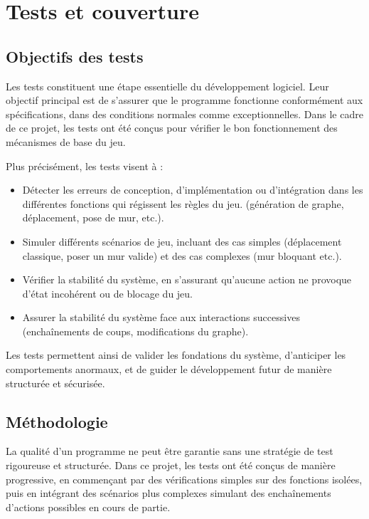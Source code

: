 \section{Tests et couverture} 
\label{sec:part-chle7}

\subsection{Objectifs des tests}

Les tests constituent une étape essentielle du développement logiciel. Leur objectif principal est de s'assurer que le programme fonctionne conformément aux spécifications, dans des conditions normales comme exceptionnelles. Dans le cadre de ce projet, les tests ont été conçus pour vérifier le bon fonctionnement des mécanismes de base du jeu.

Plus précisément, les tests visent à :
\begin{itemize}
    \item Détecter les erreurs de conception, d’implémentation ou d'intégration dans les différentes fonctions qui régissent les règles du jeu. (génération de graphe, déplacement, pose de mur, etc.).
    \item Simuler différents scénarios de jeu, incluant des cas simples (déplacement classique, poser un mur valide) et des cas complexes (mur bloquant etc.).
    \item Vérifier la stabilité du système, en s'assurant qu'aucune action ne provoque d’état incohérent ou de blocage du jeu.
    \item Assurer la stabilité du système face aux interactions successives (enchaînements de coups, modifications du graphe).
\end{itemize}
Les tests permettent ainsi de valider les fondations du système, d'anticiper les comportements anormaux, et de guider le développement futur de manière structurée et sécurisée.

\subsection{Méthodologie}

La qualité d’un programme ne peut être garantie sans une stratégie de test rigoureuse et structurée. Dans ce projet, les tests ont été conçus de manière progressive, en commençant par des vérifications simples sur des fonctions isolées, puis en intégrant des scénarios plus complexes simulant des enchaînements d’actions possibles en cours de partie.

